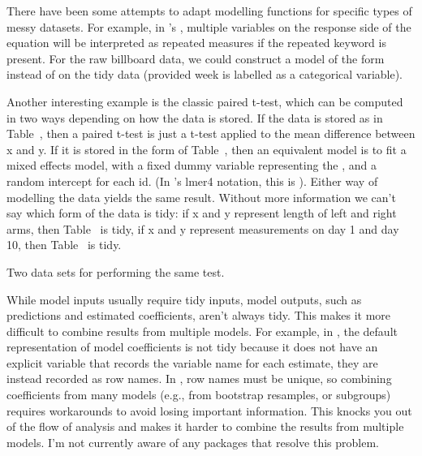 \documentclass[article]{jss}
\begin{document}
There have been some attempts to adapt modelling functions for specific types of messy datasets. For example, in 's , multiple variables on the response side of the equation will be interpreted as repeated measures if the {\sc repeated} keyword is present. For the raw billboard data, we could construct a model of the form  instead of  on the tidy data (provided week is labelled as a categorical variable). 

Another interesting example is the classic paired t-test, which can be computed in two ways depending on how the data is stored. If the data is stored as in Table~, then a paired t-test is just a t-test applied to the mean difference between x and y. If it is stored in the form of Table~, then an equivalent model is to fit a mixed effects model, with a fixed dummy variable representing the , and a random intercept for each id. (In 's lmer4 notation, this is ). Either way of modelling the data yields the same result. Without more information we can't say which form of the data is tidy: if x and y represent length of left and right arms, then Table~ is tidy, if x and y represent measurements on day 1 and day 10, then Table~ is tidy.

\begin{table}
  \centering
  \hspace{2em}%

  \caption{Two data sets for performing the same test.}
  \label{label}
\end{table}

While model inputs usually require tidy inputs, model outputs, such as predictions and estimated coefficients, aren't always tidy. This makes it more difficult to combine results from multiple models. For example, in , the default representation of model coefficients is not tidy because it does not have an explicit variable that records the variable name for each estimate, they are instead recorded as row names. In , row names must be unique, so combining coefficients from many models (e.g., from bootstrap resamples, or subgroups) requires workarounds to avoid losing important information. This knocks you out of the flow of analysis and makes it harder to combine the results from multiple models. I'm not currently aware of any packages that resolve this problem.
\end{document}
